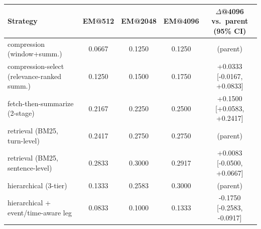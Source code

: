 \begin{tabular}{lcccc}
\toprule
Strategy & EM@512 & EM@2048 & EM@4096 & $\Delta$@4096 vs.\ parent (95\% CI) \\
\midrule
compression (window+summ.) & 0.0667 & 0.1250 & 0.1250 & (parent) \\
compression-select (relevance-ranked summ.) & 0.1250 & 0.1500 & 0.1750 & +0.0333 [-0.0167, +0.0833] \\
fetch-then-summarize (2-stage) & 0.2167 & 0.2250 & 0.2500 & +0.1500 [+0.0583, +0.2417] \\
retrieval (BM25, turn-level) & 0.2417 & 0.2750 & 0.2750 & (parent) \\
retrieval (BM25, sentence-level) & 0.2833 & 0.3000 & 0.2917 & +0.0083 [-0.0500, +0.0667] \\
hierarchical (3-tier) & 0.1333 & 0.2583 & 0.3000 & (parent) \\
hierarchical + event/time-aware leg & 0.0833 & 0.1000 & 0.1333 & -0.1750 [-0.2583, -0.0917] \\
\bottomrule
\end{tabular}